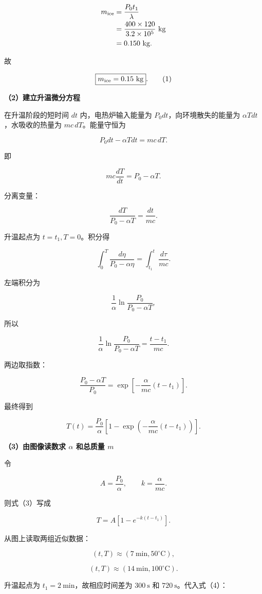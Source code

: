 \documentclass[12pt,a4paper,UTF8]{ctexart}
\begin{document}
\[
\begin{aligned}
m_{\rm ice}
&=\frac{P_0t_1}{\lambda}\\
&=\frac{400\times120}{3.2\times10^5}\ \mathrm{kg}\\
&=0.150\ \mathrm{kg}.
\end{aligned}
\]

故

\[
\boxed{m_{\rm ice}=0.15\ \mathrm{kg}}.
\tag{1}
\]

\textbf{（2）建立升温微分方程}

在升温阶段的短时间 \(dt\) 内，电热炉输入能量为
\(P_0dt\)，向环境散失的能量为 \(\alpha Tdt\)，水吸收的热量为
\(mc\,dT\)。能量守恒为

\[
P_0dt-\alpha Tdt=mc\,dT.
\]

即

\[
mc\frac{dT}{dt}=P_0-\alpha T.
\tag{2}
\]

分离变量：

\[
\frac{dT}{P_0-\alpha T}=\frac{dt}{mc}.
\]

升温起点为 \(t=t_1,T=0\)。积分得

\[
\int_0^T\frac{d\eta}{P_0-\alpha\eta}
=\int_{t_1}^t\frac{d\tau}{mc}.
\]

左端积分为

\[
\frac1\alpha\ln\frac{P_0}{P_0-\alpha T},
\]

所以

\[
\frac1\alpha\ln\frac{P_0}{P_0-\alpha T}
=\frac{t-t_1}{mc}.
\]

两边取指数：

\[
\frac{P_0-\alpha T}{P_0}
=\exp\left[-\frac{\alpha}{mc}(t-t_1)\right].
\]

最终得到

\[
\boxed{
T(t)=\frac{P_0}{\alpha}
\left[1-\exp\left(-\frac{\alpha}{mc}(t-t_1)\right)\right]
}.
\tag{3}
\]

\textbf{（3）由图像读数求 \(\alpha\) 和总质量 \(m\)}

令

\[
A=\frac{P_0}{\alpha},
\qquad
k=\frac{\alpha}{mc}.
\]

则式（3）写成

\[
T=A[1-e^{-k(t-t_1)}].
\tag{4}
\]

从图上读取两组近似数据：

\[
(t,T)\approx(7\ \mathrm{min},50^\circ\mathrm C),
\]

\[
(t,T)\approx(14\ \mathrm{min},100^\circ\mathrm C).
\]

升温起点为 \(t_1=2\ \mathrm{min}\)，故相应时间差为 \(300\ \mathrm s\) 和
\(720\ \mathrm s\)。代入式（4）：
\end{document}
